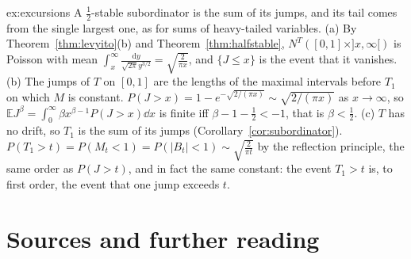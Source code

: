 \begin{solution}{ex:excursions}
\idea A $\frac12$-stable subordinator is the sum of its jumps, and its tail comes from the single largest one, as for sums of heavy-tailed variables.
\writeup (a) By Theorem~\ref{thm:levyito}(b) and Theorem~\ref{thm:halfstable}, $N^T([0,1]\times]x,\infty[)$ is Poisson with mean $\int_x^\infty\frac{\mathrm dy}{\sqrt{2\pi}y^{3/2}}=\sqrt{\frac2{\pi x}}$, and $\{J\le x\}$ is the event that it vanishes.
(b) The jumps of $T$ on $[0,1]$ are the lengths of the maximal intervals before $T_1$ on which $M$ is constant. $P(J>x)=1-e^{-\sqrt{2/(\pi x)}}\sim\sqrt{2/(\pi x)}$ as $x\to\infty$, so $\mathbb EJ^\beta=\int_0^\infty\beta x^{\beta-1}P(J>x)\dd x$ is finite iff
$\beta-1-\frac12<-1$, that is $\beta<\frac12$. (c) $T$ has no drift, so $T_1$ is the sum of its jumps (Corollary~\ref{cor:subordinator}). $P(T_1>t)=P(M_t<1)=P(|B_t|<1)\sim\sqrt{\frac2{\pi t}}$ by the reflection principle, the same order
as $P(J>t)$, and in fact the same constant: the event $T_1>t$ is, to first order, the event that one jump exceeds $t$.
\end{solution}

\section*{Sources and further reading}

